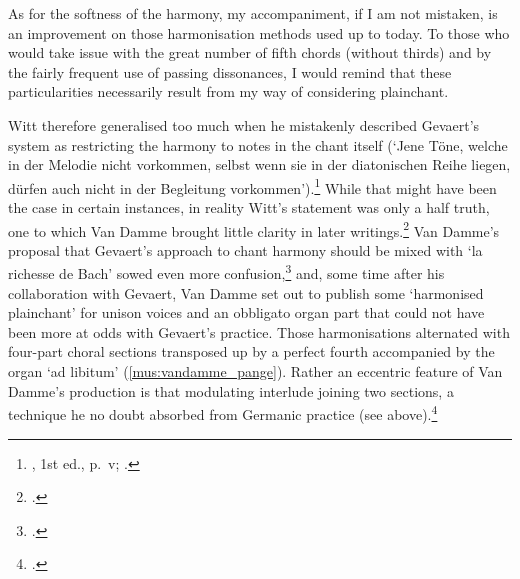 {\cite[`Preface' p.~6, Body matter p.~1]{GevaertVademecumorganistecontenant1871}}
{As for the softness of the harmony, my accompaniment, if I am not mistaken, is an improvement on those harmonisation methods used up to today. To those who would take issue with the great number of fifth chords (without thirds) and by the fairly frequent use of passing dissonances, I would remind that these particularities necessarily result from my way of considering plainchant.}
\noindent

Witt therefore generalised too much when he mistakenly described Gevaert's system as restricting the harmony to notes in the chant itself (`Jene Töne, welche in der Melodie nicht vorkommen, selbst wenn sie in der diatonischen Reihe liegen, dürfen auch nicht in der Begleitung vorkommen').\footnote{\cite{WittOrganumcomitansad1872}, 1st ed., p.~v; \cite[Witt might also have been responsible for the following review which commits the same error][82]{UnsignedReviewVademecumorganiste1871}.}
While that might have been the case in certain instances, in reality Witt's statement was only a half truth, one to which Van Damme brought little clarity in later writings.\footcite[70]{VanDammeUeberChoralOrgelbegleitung1872}
Van Damme's proposal that Gevaert's approach to chant harmony should be mixed with `la richesse de Bach' sowed even more confusion,\footcite[14]{VanDammeaccompagnementplainchant1881} and, some time after his collaboration with Gevaert, Van Damme set out to publish some `harmonised plainchant' for unison voices and an obbligato organ part that could not have been more at odds with Gevaert's practice.
Those harmonisations alternated with four-part choral sections transposed up by a perfect fourth accompanied by the organ `ad libitum' (\cref{mus:vandamme_pange}).
Rather an eccentric feature of Van Damme's production is that modulating interlude joining two sections, a technique he no doubt absorbed from Germanic practice (see  above).\footcite[1--2; The eighth instalment in the series refers to the author's \emph{Enchiridion chorale ad Vesperas} published in 1874 by C. Poelman of Ghent which makes it possible to date the series after Van Damme's collaboration with Gevaert]{VanDammePangelingua}

